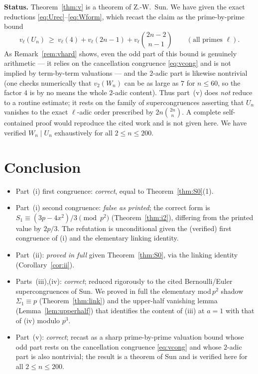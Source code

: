 \documentclass[12pt]{article}
\theoremstyle{remark}
\newcommand{\bin}[2]{\binom{#1}{#2}}
\begin{document}
\noindent\textbf{Status.}  Theorem~\ref{thm:v} is a theorem of Z.-W.\ Sun.
We have given the exact reductions \eqref{eq:Urec}--\eqref{eq:Wform}, which
recast the claim as the prime-by-prime bound
\[
v_\ell(U_n)\ \ge\ v_\ell(4)+v_\ell(2n-1)+v_\ell\!\bin{2n-2}{n-1}
\qquad(\text{all primes }\ell).
\]
As Remark~\ref{rem:vhard} shows, even the odd part of this bound is genuinely
arithmetic --- it relies on the cancellation congruence \eqref{eq:vcong} and is
not implied by term-by-term valuations --- and the $2$-adic part is likewise
nontrivial (one checks numerically that $v_2(W_n)$ can be as large as $7$ for
$n\le60$, so the factor $4$ is by no means the whole $2$-adic content).  Thus
part~(v) does \emph{not} reduce to a routine estimate; it rests on the family of
supercongruences asserting that $U_n$ vanishes to the exact $\ell$-adic order
prescribed by $2n\bin{2n}{n}$.  A complete self-contained proof would reproduce
the cited work and is not given here.  We have verified $W_n\mid U_n$
exhaustively for all $2\le n\le200$.

\section{Conclusion}

\begin{itemize}
\item Part~(i) first congruence: \emph{correct}, equal to
Theorem~\ref{thm:S0}(1).
\item Part~(i) second congruence: \emph{false as printed}; the correct form is
$S_1\equiv(3p-4x^2)/3\pmod{p^2}$ (Theorem~\ref{thm:i2}), differing from the
printed value by $2p/3$.  The refutation is unconditional given the (verified)
first congruence of (i) and the elementary linking identity.
\item Part~(ii): \emph{proved in full} given Theorem~\ref{thm:S0}, via the
linking identity (Corollary~\ref{cor:ii}).
\item Parts~(iii),(iv): \emph{correct}; reduced rigorously to the cited
Bernoulli/Euler supercongruences of Sun.  We proved in full the elementary
mod\,$p^2$ shadow $\Sigma_1\equiv p$ (Theorem~\ref{thm:link}) and the
upper-half vanishing lemma (Lemma~\ref{lem:upperhalf}) that identifies the
content of (iii) at $a=1$ with that of (iv) modulo $p^3$.
\item Part~(v): \emph{correct}; recast as a sharp prime-by-prime valuation
bound whose odd part rests on the cancellation congruence \eqref{eq:vcong} and
whose $2$-adic part is also nontrivial; the result is a theorem of Sun and is
verified here for all $2\le n\le200$.
\end{itemize}
\end{document}
